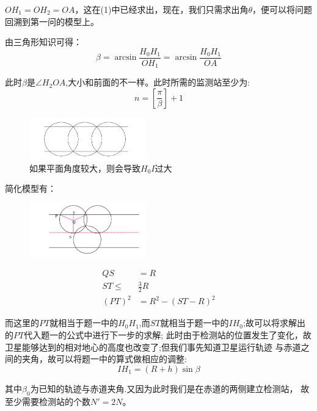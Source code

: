 \documentclass[UTF8]{ctexart}
\begin{document}
        \par $OH_1=OH_2=OA$，这在(1)中已经求出，现在，我们只需求出角$\theta$，便可以将问题回溯到第一问的模型上。
        \par 由三角形知识可得：
        \begin{equation}
            \beta =\arcsin \frac{H_0H_1}{OH_1} =\arcsin \frac{H_0H_1}{OA}
        \end{equation}
        \par 此时$\beta $是$\angle H_2OA$,大小和前面的不一样。此时所需的监测站至少为:
        \begin{equation*}
            n=[\frac{\pi}{\beta}]+1
        \end{equation*}
        \begin{figure}[!htbp]
            \centering
            \includegraphics*[width=0.45\textwidth]{第二问5}
            \caption{如果平面角度较大，则会导致$H_0I$过大}
        \end{figure}
        \newpage
        \par 简化模型有：
        \begin{figure}
            \centering
            \includegraphics*[width=0.45\textwidth]{第二问6}
        \end{figure}
        \begin{align*}
            QS &=R\\
            ST \le &\frac{3}{2} R\\
            (PT)^2 &=R^2-(ST-R)^2
        \end{align*}
        \par 而这里的$PT$就相当于题一中的$H_0H_1$,而$ST$就相当于题一中的$IH_0$;故可以将求解出的$PT$代入题一的公式中进行下一步的求解;
              此时由于检测站的位置发生了变化，故卫星能够达到的相对地心的高度也改变了;但我们事先知道卫星运行轨迹 与赤道之间的夹角，故可以将题一中的算式做相应的调整: 
        \begin{equation}
            IH_1=(R+h)\sin \beta
        \end{equation}
        \par 其中$\beta_0$为已知的轨迹与赤道夹角.又因为此时我们是在赤道的两侧建立检测站， 故至少需要检测站的个数$N' =2N$。
        
\end{document}
